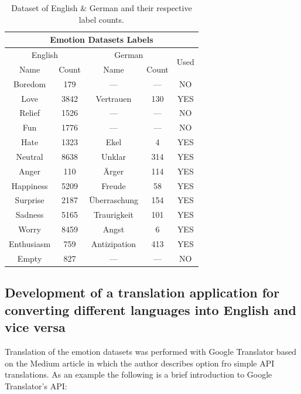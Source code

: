 \documentclass[11pt]{article}
\begin{document}
\begin{table}[h!]
\centering
\begin{tabular}{ | c c | c c | c | }
    \hline
    \multicolumn{5}{|c|}{Emotion Datasets Labels} \\
    
    \hline
    \multicolumn{2}{|c|}{English} & \multicolumn{2}{|c|}{German} & \multirow{2}{*}{Used} \\
    Name & Count & Name & Count \\
    \hline
    Boredom    &  179 & ---           & --- & NO  \\
    Love       & 3842 & Vertrauen     & 130 & YES \\
    Relief     & 1526 & ---           & --- & NO  \\ 
    Fun        & 1776 & ---           & --- & NO  \\
    Hate       & 1323 & Ekel          &   4 & YES \\
    Neutral    & 8638 & Unklar        & 314 & YES \\
    Anger      &  110 & Ärger         & 114 & YES \\
    Happiness  & 5209 & Freude        &  58 & YES \\
    Surprise   & 2187 & Überraschung  & 154 & YES \\
    Sadness    & 5165 & Traurigkeit   & 101 & YES \\
    Worry      & 8459 & Angst         &   6 & YES \\
    Enthusiasm &  759 & Antizipation  & 413 & YES \\
    Empty      &  827 & ---           & --- & NO  \\
    \hline
\end{tabular}
\caption{Dataset of English \& German and their respective label counts.}
\label{table:dataset_labels}
\end{table}

\subsection{Development of a translation application for converting different languages into English and vice versa}
Translation of the emotion datasets was performed with Google Translator based on the Medium article\cite{Nidhaloff_how_to_translate_text_with_python} in which the author describes option fro simple API translations. As an example the following is a brief introduction to Google Translator's API:
\end{document}
